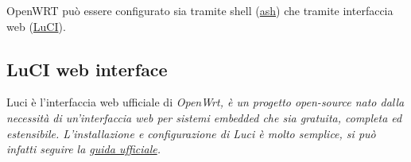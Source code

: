 OpenWRT può essere configurato sia tramite shell (\href{https://en.wikipedia.org/wiki/Almquist_shell}{ash}) che tramite interfaccia web (\href{https://openwrt.org/docs/guide-user/luci/start}{LuCI}).


\subsection{LuCI web interface}

Luci è l'interfaccia web ufficiale di \it{OpenWrt}, è un progetto open-source nato dalla necessità di un'interfaccia web per sistemi embedded che sia gratuita, completa ed estensibile. L'installazione e configurazione di Luci è molto semplice, si può infatti seguire la \href{https://openwrt.org/docs/guide-user/luci/luci.essentials}{guida ufficiale}.


